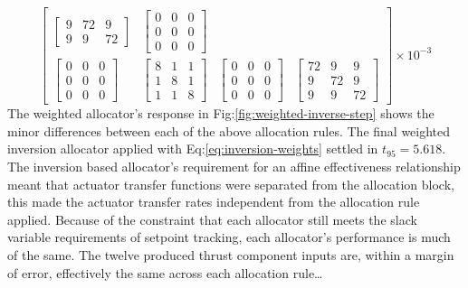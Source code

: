 \begin{equation}
\begin{bmatrix}
\begin{bmatrix}
9 & 72 & 9\\
9 & 9 & 72
\end{bmatrix}
&
\begin{bmatrix}
0 & 0 & 0\\
0 & 0 & 0\\
0 & 0 & 0
\end{bmatrix}
\\
\begin{bmatrix}
0 & 0 & 0\\
0 & 0 & 0\\
0 & 0 & 0
\end{bmatrix}
&
\begin{bmatrix}
8 & 1 & 1\\
1 & 8 & 1\\
1 & 1 & 8
\end{bmatrix}
&
\begin{bmatrix}
0 & 0 & 0\\
0 & 0 & 0\\
0 & 0 & 0
\end{bmatrix}
&
\begin{bmatrix}
72 & 9 & 9\\
9 & 72 & 9\\
9 & 9 & 72
\end{bmatrix}
\end{bmatrix}\times 10^{-3}
\end{equation}
The weighted allocator's response in Fig:\ref{fig:weighted-inverse-step} shows the minor differences between each of the above allocation rules. The final weighted inversion allocator applied with Eq:\ref{eq:inversion-weights} settled in $t_{95}=5.618$. The inversion based allocator's requirement for an affine effectiveness relationship meant that actuator transfer functions were separated from the allocation block, this made the actuator transfer rates independent from the allocation rule applied. Because of the constraint that each allocator still meets the slack variable requirements of setpoint tracking, each allocator's performance is much of the same. The twelve produced thrust component inputs are, within a margin of error, effectively the same across each allocation rule\ldots
\newpage
